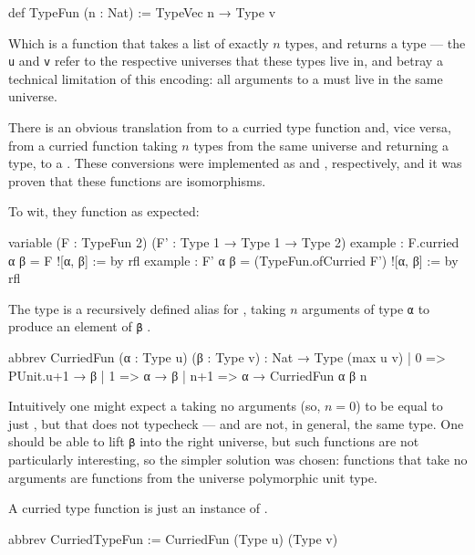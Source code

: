 \documentclass[titlepage]{report}
\newcommand\lean[1]{{%
\def\leanmode{1}%
\small \texttt{#1}%
\undef\leanmode%
}}
\begin{document}
\begin{leancode}
    def TypeFun (n : Nat)
      := TypeVec n → Type v
\end{leancode}

Which is a function that takes a list of exactly $n$ types, and returns a type --- the \lean{u} and
\lean{v} refer to the respective universes that these types live in, and betray a technical limitation
of this encoding: all arguments to a  must live in the same universe.

There is an obvious translation from  to a curried type function and, vice versa, from a curried function taking $n$ types from the same universe and returning a type, to a .
These conversions were implemented as  and , respectively, and it was proven that these functions are isomorphisms. 

To wit, they function as expected:
\begin{leancode}
    variable (F : TypeFun 2) (F' : Type 1 → Type 1 → Type 2)
    example : F.curried α β = F ![α, β]                 := by rfl
    example : F' α β = (TypeFun.ofCurried F') ![α, β]   := by rfl
\end{leancode}

The type  is a recursively defined alias for , taking $n$ arguments of type \lean{α} to produce an element of \lean{β}.
\begin{leancode}
    abbrev CurriedFun (α : Type u) (β : Type v) : Nat → Type (max u v)
      | 0   => PUnit.{u+1} → β
      | 1   => α → β
      | n+1 => α → CurriedFun α β n
\end{leancode}
Intuitively one might expect a  taking no arguments (so, $n = 0$) to be equal to  just , but that does not typecheck ---  and  are not, in general, the same type.
One should be able to lift \lean{β} into the right universe, but such functions are not particularly interesting, so the simpler solution was chosen: functions that take no arguments are functions from the universe polymorphic unit type.

A curried type function is just an instance of .
\begin{leancode}
    abbrev CurriedTypeFun := CurriedFun (Type u) (Type v)
\end{leancode}
\end{document}
